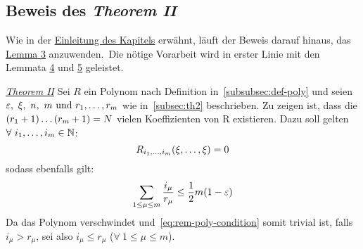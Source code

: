     \subsection{Beweis des \emph{Theorem II}}
        \label{subsec:proof-th2}
        \textrm{Wie in der \hyperref[sec:th2]{Einleitung des Kapitels} erwähnt, läuft der Beweis darauf hinaus, das
        \hyperref[subsec:lemma3]{Lemma 3} anzuwenden.\ Die nötige Vorarbeit wird in erster Linie mit den Lemmata
        \hyperref[subsec:lemma4]{4} und \hyperref[subsec:lemma5]{5} geleistet.}
        \begin{namedproof}{\emph{\hyperref[subsec:th2]{Theorem II}}}
            Sei $R$ ein Polynom nach Definition in~\ref{subsubsec:def-poly} und seien $\varepsilon,\ \xi,\ n,\ m \ \textrm{und}\  r_1, \dots, r_m$ wie in~\ref{subsec:th2} beschrieben.
            \newline
            Zu zeigen ist, dass die $(r_1+1) \dots (r_m+1) = N$ vielen Koeffizienten von R existieren.
            \newline 
            Dazu soll gelten $\forall \ i_1, \dots, i_m \in \mathbb{N}$:
            \begin{equation}
                R_{i_1, \dots, i_m}(\xi, \dots, \xi) = 0 \label{eq:rem-poly-condition}
            \end{equation}
            sodass ebenfalls gilt:
            \begin{equation*}
                \sum_{1 \leq \mu \leq m} \frac{i_\mu}{r_\mu} \leq \frac{1}{2} m(1 - \varepsilon)
            \end{equation*}
            Da das Polynom verschwindet und~\eqref{eq:rem-poly-condition} somit trivial ist, falls $i_\mu > r_\mu$, sei
            also $i_\mu \leq r_\mu$ ($\forall \ 1 \leq \mu \leq m$).
            
        \end{namedproof}
    
